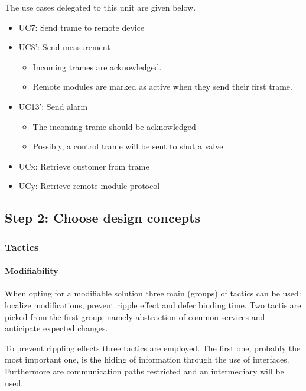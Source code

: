 \npar The use cases delegated to this unit are given below.

\begin{itemize}
	\item UC7: Send trame to remote device
	\item UC8': Send measurement
	\begin{itemize}
	    \item Incoming trames are acknowledged.
    	\item Remote modules are marked as active when they send their first trame.
  	\end{itemize}
  	\item UC13': Send alarm
  	\begin{itemize}
		\item The incoming trame should be acknowledged
		\item Possibly, a control trame will be sent to shut a valve
  	\end{itemize}
  	\item UCx: Retrieve customer from trame
  	\item UCy: Retrieve remote module protocol
\end{itemize}

\subsection{Step 2: Choose design concepts}
\label{add:it2/concepts}

\subsubsection{Tactics}
\label{add:it2/tactics}

\paragraph{Modifiability}

\npar When opting for a modifiable solution three main (groups) of tactics can
be used: localize modifications, prevent ripple effect and defer binding time.
Two tactis are picked from the first group, namely abstraction of common
services and anticipate expected changes.

\npar To prevent rippling effects three tactics are employed. The first one,
probably the most important one, is the hiding of information through the use of
interfaces. Furthermore are communication paths restricted and an intermediary
will be used.

